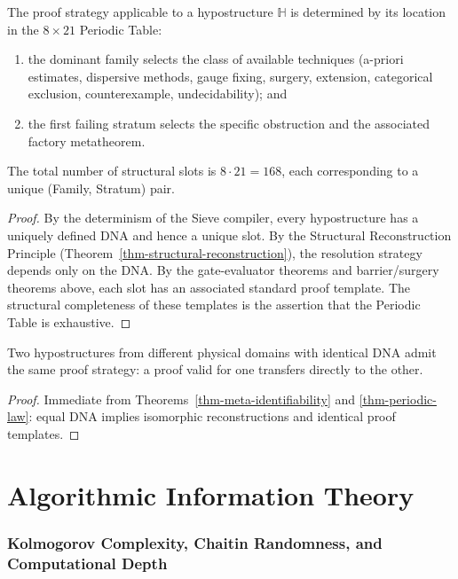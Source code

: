 \begin{theorem}\label{thm-periodic-law}
The proof strategy applicable to a hypostructure $\mathbb H$ is determined by its location in the $8\times 21$ Periodic Table:
\begin{enumerate}
\item the dominant family selects the class of available techniques (a-priori estimates, dispersive methods, gauge fixing, surgery, extension, categorical exclusion, counterexample, undecidability); and
\item the first failing stratum selects the specific obstruction and the associated factory metatheorem.
\end{enumerate}
The total number of structural slots is $8 \cdot 21 = 168$, each corresponding to a unique (Family, Stratum) pair.
\end{theorem}

\begin{proof}
By the determinism of the Sieve compiler, every hypostructure has a uniquely defined DNA and hence a unique slot. By the Structural Reconstruction Principle (Theorem~\ref{thm-structural-reconstruction}), the resolution strategy depends only on the DNA. By the gate-evaluator theorems and barrier/surgery theorems above, each slot has an associated standard proof template. The structural completeness of these templates is the assertion that the Periodic Table is exhaustive.
\end{proof}

\begin{corollary}\label{cor-cross-domain-transfer}
Two hypostructures from different physical domains with identical DNA admit the same proof strategy: a proof valid for one transfers directly to the other.
\end{corollary}

\begin{proof}
Immediate from Theorems~\ref{thm-meta-identifiability} and \ref{thm-periodic-law}: equal DNA implies isomorphic reconstructions and identical proof templates.
\end{proof}

\part{Algorithmic Information Theory}

\section{Kolmogorov Complexity, Chaitin Randomness, and Computational Depth}

